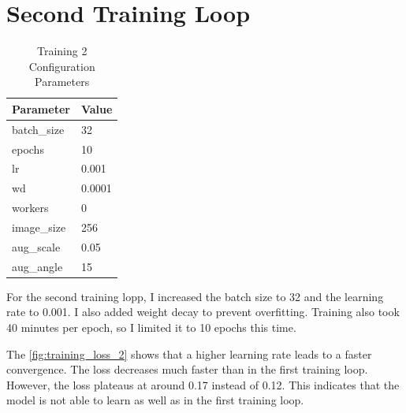 \documentclass[11pt,a4paper]{article}
\begin{document}
\section{Second Training Loop}
\begin{table}[H]
    \centering
    \begin{tabular}{ll}
    \toprule
    \textbf{Parameter} & \textbf{Value} \\
    \midrule
    batch\_size   & 32 \\
    epochs        & 10 \\
    lr            & 0.001 \\
    wd            & 0.0001 \\
    workers       & 0 \\
    image\_size   & 256 \\
    aug\_scale    & 0.05 \\
    aug\_angle    & 15 \\
    \bottomrule
    \end{tabular}
    \caption{Training 2 Configuration Parameters}
    \label{tab:args_2}
\end{table}

For the second training lopp, I increased the batch size to 32 and the learning rate to 0.001. I also added weight decay to prevent overfitting. Training also took 40 minutes per epoch, so I limited it to 10 epochs this time.

The \autoref{fig:training_loss_2} shows that a higher learning rate leads to a faster convergence. The loss decreases much faster than in the first training loop. However, the loss plateaus at around 0.17 instead of 0.12. This indicates that the model is not able to learn as well as in the first training loop.
\end{document}

